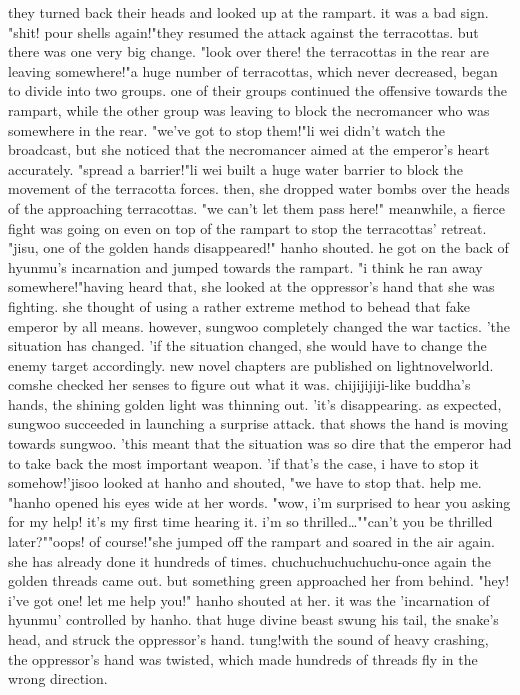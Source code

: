 they turned back their heads and looked up at the rampart.
 it was a bad sign.
"shit! pour shells again!"they resumed the attack against the terracottas.
 but there was one very big change.
"look over there! the terracottas in the rear are leaving somewhere!"a huge number of terracottas, which never decreased, began to divide into two groups.
one of their groups continued the offensive towards the rampart, while the other group was leaving to block the necromancer who was somewhere in the rear.
"we've got to stop them!"li wei didn't watch the broadcast, but she noticed that the necromancer aimed at the emperor's heart accurately.
"spread a barrier!"li wei built a huge water barrier to block the movement of the terracotta forces.
then, she dropped water bombs over the heads of the approaching terracottas.
"we can't let them pass here!"
meanwhile, a fierce fight was going on even on top of the rampart to stop the terracottas' retreat.
"jisu, one of the golden hands disappeared!" hanho shouted.
he got on the back of hyunmu's incarnation and jumped towards the rampart.
"i think he ran away somewhere!"having heard that, she looked at the oppressor's hand that she was fighting.
she thought of using a rather extreme method to behead that fake emperor by all means.
 however, sungwoo completely changed the war tactics.
'the situation has changed.
'if the situation changed, she would have to change the enemy target accordingly.
new novel chapters are published on lightnov­elworld.
comshe checked her senses to figure out what it was.
chijijijiji-like buddha's hands, the shining golden light was thinning out.
'it's disappearing.
 as expected, sungwoo succeeded in launching a surprise attack.
 that shows the hand is moving towards sungwoo.
'this meant that the situation was so dire that the emperor had to take back the most important weapon.
'if that's the case, i have to stop it somehow!'jisoo looked at hanho and shouted, "we have to stop that.
 help me.
"hanho opened his eyes wide at her words.
"wow, i'm surprised to hear you asking for my help! it's my first time hearing it.
 i'm so thrilled…""can't you be thrilled later?""oops! of course!"she jumped off the rampart and soared in the air again.
 she has already done it hundreds of times.
chuchuchuchuchuchu-once again the golden threads came out.
 but something green approached her from behind.
 "hey! i've got one! let me help you!" hanho shouted at her.
it was the 'incarnation of hyunmu' controlled by hanho.
that huge divine beast swung his tail, the snake's head, and struck the oppressor's hand.
tung!with the sound of heavy crashing, the oppressor's hand was twisted, which made hundreds of threads fly in the wrong direction.
